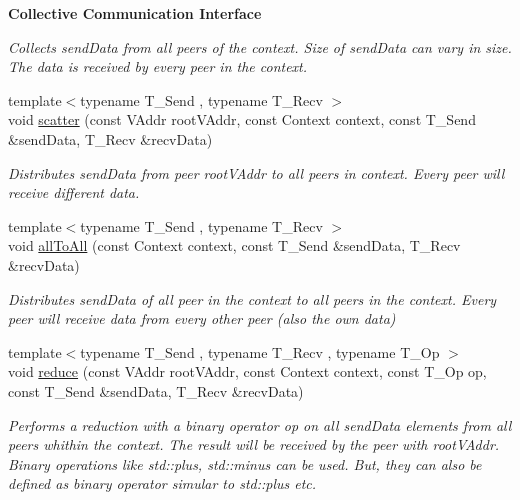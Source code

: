 \begin{Indent}{\bf Collective Communication Interface}
\begin{DoxyCompactItemize}
\begin{DoxyCompactList}\small\item\em Collects {\itshape send\+Data} from all peers of the {\itshape context}. Size of {\itshape send\+Data} can vary in size. The data is received by every peer in the {\itshape context}. \end{DoxyCompactList}\item 
{\footnotesize template$<$typename T\+\_\+\+Send , typename T\+\_\+\+Recv $>$ }\\void \hyperlink{structgraybat_1_1communicationPolicy_1_1BMPI_ad1263d7d13beec1fe7267696c908d6eb}{scatter} (const V\+Addr root\+V\+Addr, const Context context, const T\+\_\+\+Send \&send\+Data, T\+\_\+\+Recv \&recv\+Data)
\begin{DoxyCompactList}\small\item\em Distributes {\itshape send\+Data} from peer {\itshape root\+V\+Addr} to all peers in {\itshape context}. Every peer will receive different data. \end{DoxyCompactList}\item 
{\footnotesize template$<$typename T\+\_\+\+Send , typename T\+\_\+\+Recv $>$ }\\void \hyperlink{structgraybat_1_1communicationPolicy_1_1BMPI_a1558d37c09b31ce63e7926f183515fa5}{all\+To\+All} (const Context context, const T\+\_\+\+Send \&send\+Data, T\+\_\+\+Recv \&recv\+Data)
\begin{DoxyCompactList}\small\item\em Distributes {\itshape send\+Data} of all peer in the {\itshape context} to all peers in the {\itshape context}. Every peer will receive data from every other peer (also the own data) \end{DoxyCompactList}\item 
{\footnotesize template$<$typename T\+\_\+\+Send , typename T\+\_\+\+Recv , typename T\+\_\+\+Op $>$ }\\void \hyperlink{structgraybat_1_1communicationPolicy_1_1BMPI_abee4b7a6d3026127cac5b25aa7d860f6}{reduce} (const V\+Addr root\+V\+Addr, const Context context, const T\+\_\+\+Op op, const T\+\_\+\+Send \&send\+Data, T\+\_\+\+Recv \&recv\+Data)
\begin{DoxyCompactList}\small\item\em Performs a reduction with a binary operator {\itshape op} on all {\itshape send\+Data} elements from all peers whithin the {\itshape context}. The result will be received by the peer with {\itshape root\+V\+Addr}. Binary operations like std\+::plus, std\+::minus can be used. But, they can also be defined as binary operator simular to std\+::plus etc. \end{DoxyCompactList}\item 

\end{DoxyCompactItemize}
\end{Indent}
